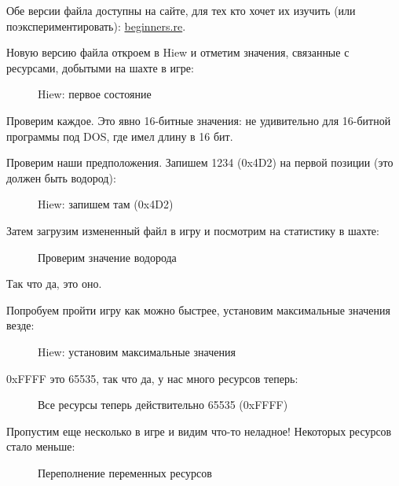 Обе версии файла доступны на сайте, для тех кто хочет их изучить (или поэкспериментировать): 
\href{http://beginners.re/examples/millenium_DOS_game/}{beginners.re}.

\clearpage
Новую версию файла откроем в Hiew и отметим значения, связанные с ресурсами, добытыми на шахте в игре: 

\begin{figure}[H]
\centering
{}
\caption{Hiew: первое состояние}
\label{fig:mill_hiew3}
\end{figure}

Проверим каждое.
Это явно 16-битные значения: не удивительно для 16-битной программы под DOS, где \Tint имел длину в 16 бит.

\clearpage
Проверим наши предположения.
Запишем 1234 (0x4D2) на первой позиции (это должен быть водород):

\begin{figure}[H]
\centering
{}
\caption{Hiew: запишем там (0x4D2)}
\label{fig:mill_hiew4}
\end{figure}

Затем загрузим измененный файл в игру и посмотрим на статистику в шахте:

\begin{figure}[H]
\centering
{}
\caption{Проверим значение водорода}
\label{fig:mill_5}
\end{figure}

Так что да, это оно.

\clearpage
Попробуем пройти игру как можно быстрее, установим максимальные значения везде:

\begin{figure}[H]
\centering
{}
\caption{Hiew: установим максимальные значения}
\label{fig:mill_hiew7}
\end{figure}

0xFFFF это 65535, так что да, у нас много ресурсов теперь:

\begin{figure}[H]
\centering
{}
\caption{Все ресурсы теперь действительно 65535 (0xFFFF)}
\label{fig:mill_6}
\end{figure}

\clearpage
Пропустим еще несколько  в игре и видим что-то неладное! 
Некоторых ресурсов стало меньше:

\begin{figure}[H]
\centering
{}
\caption{Переполнение переменных ресурсов}
\label{fig:mill_8}
\end{figure}

